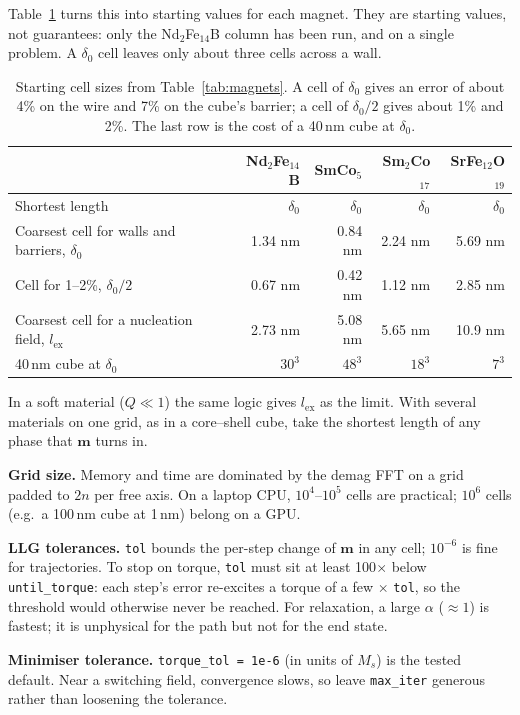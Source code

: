 \documentclass[10pt,a4paper]{article}
\newcommand{\code}[1]{\texttt{#1}}
\newcommand{\vm}{\mathbf{m}}
\begin{document}
Table~\ref{tab:mesh} turns this into starting values for each magnet. They are starting values, not guarantees: only the
Nd$_2$Fe$_{14}$B column has been run, and on a single problem. A $\delta_0$ cell leaves only about three cells across a wall.

\begin{table}[h]
\centering\small
\caption{Starting cell sizes from Table~\ref{tab:magnets}. A cell of $\delta_0$ gives an error of about 4\% on the wire and 7\% on the
cube's barrier; a cell of $\delta_0/2$ gives about 1\% and 2\%. The last row is the cost of a 40\,nm cube at $\delta_0$.}
\label{tab:mesh}
\begin{tabular}{@{}l r r r r@{}}
\toprule
& Nd$_2$Fe$_{14}$B & SmCo$_5$ & Sm$_2$Co$_{17}$ & SrFe$_{12}$O$_{19}$ \\
\midrule
Shortest length & $\delta_0$ & $\delta_0$ & $\delta_0$ & $\delta_0$ \\
Coarsest cell for walls and barriers, $\delta_0$ & 1.34 nm & 0.84 nm & 2.24 nm & 5.69 nm \\
Cell for 1--2\%, $\delta_0/2$ & 0.67 nm & 0.42 nm & 1.12 nm & 2.85 nm \\
Coarsest cell for a nucleation field, $l_\mathrm{ex}$ & 2.73 nm & 5.08 nm & 5.65 nm & 10.9 nm \\
40\,nm cube at $\delta_0$ & $30^3$ & $48^3$ & $18^3$ & $7^3$ \\
\bottomrule
\end{tabular}
\end{table}

In a soft material ($Q\ll 1$) the same logic gives $l_\mathrm{ex}$ as the limit. With several materials on one grid, as in a
core--shell cube, take the shortest length of any phase that $\vm$ turns in.

\textbf{Grid size.} Memory and time are dominated by the demag FFT on a grid padded to $2n$ per free axis. On a laptop CPU,
$10^4$--$10^5$ cells are practical; $10^6$ cells (e.g.\ a 100\,nm cube at 1\,nm) belong on a GPU.

\textbf{LLG tolerances.} \code{tol} bounds the per-step change of $\vm$ in any cell; $10^{-6}$ is fine for trajectories.
To stop on torque, \code{tol} must sit at least 100$\times$ below \code{until\_torque}: each step's error re-excites a
torque of a few $\times$ \code{tol}, so the threshold would otherwise never be reached. For relaxation, a large
$\alpha$ ($\approx 1$) is fastest; it is unphysical for the path but not for the end state.

\textbf{Minimiser tolerance.} \code{torque\_tol = 1e-6} (in units of $M_s$) is the tested default. Near a switching
field, convergence slows, so leave \code{max\_iter} generous rather than loosening the tolerance.
\end{document}

